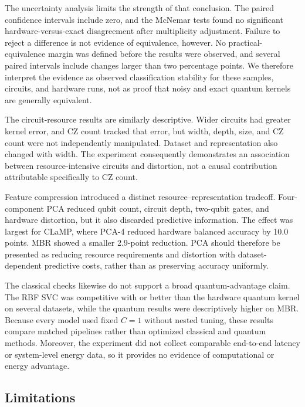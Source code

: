 \documentclass[letterpaper]{article} %
\begin{document}
The uncertainty analysis limits the strength of that conclusion. The paired confidence intervals include zero, and the McNemar tests found no significant hardware-versus-exact disagreement after multiplicity adjustment. Failure to reject a difference is not evidence of equivalence, however. No practical-equivalence margin was defined before the results were observed, and several paired intervals include changes larger than two percentage points. We therefore interpret the evidence as observed classification stability for these samples, circuits, and hardware runs, not as proof that noisy and exact quantum kernels are generally equivalent.

The circuit-resource results are similarly descriptive. Wider circuits had greater kernel error, and CZ count tracked that error, but width, depth, size, and CZ count were not independently manipulated. Dataset and representation also changed with width. The experiment consequently demonstrates an association between resource-intensive circuits and distortion, not a causal contribution attributable specifically to CZ count.

Feature compression introduced a distinct resource--representation tradeoff. Four-component PCA reduced qubit count, circuit depth, two-qubit gates, and hardware distortion, but it also discarded predictive information. The effect was largest for CLaMP, where PCA-4 reduced hardware balanced accuracy by 10.0 points. MBR showed a smaller 2.9-point reduction. PCA should therefore be presented as reducing resource requirements and distortion with dataset-dependent predictive costs, rather than as preserving accuracy uniformly.

The classical checks likewise do not support a broad quantum-advantage claim. The RBF SVC was competitive with or better than the hardware quantum kernel on several datasets, while the quantum results were descriptively higher on MBR. Because every model used fixed $C=1$ without nested tuning, these results compare matched pipelines rather than optimized classical and quantum methods. Moreover, the experiment did not collect comparable end-to-end latency or system-level energy data, so it provides no evidence of computational or energy advantage.

\subsection{Limitations}
\end{document}
